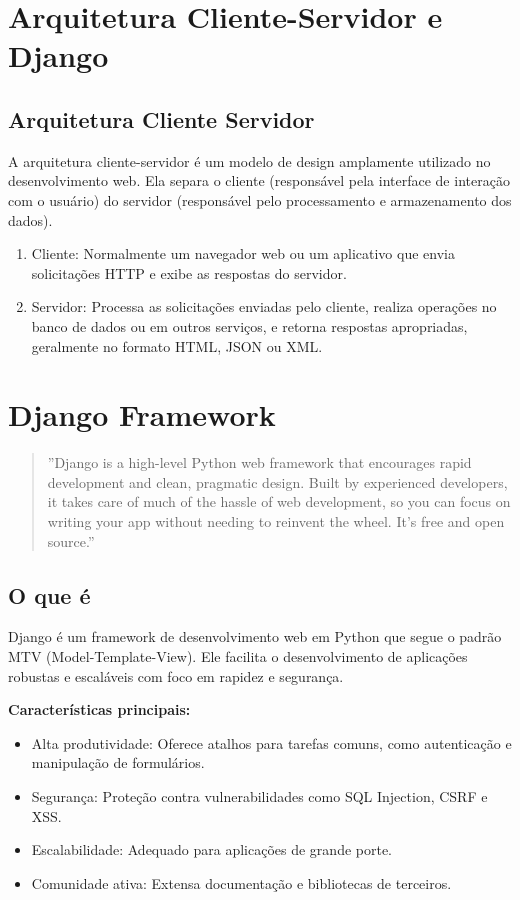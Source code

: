 \chapter{Arquitetura Cliente-Servidor e Django}

\section{Arquitetura Cliente Servidor}
A arquitetura cliente-servidor \'{e} um modelo de design amplamente utilizado no desenvolvimento web. Ela separa o cliente (respons\'avel pela interface de intera\c{c}\~ao com o usu\'ario) do servidor (respons\'avel pelo processamento e armazenamento dos dados).

\begin{enumerate}
    \item Cliente: Normalmente um navegador web ou um aplicativo que envia solicita\c{c}\~oes HTTP e exibe as respostas do servidor.
    \item Servidor: Processa as solicita\c{c}\~oes enviadas pelo cliente, realiza opera\c{c}\~oes no banco de dados ou em outros servi\c{c}os, e retorna respostas apropriadas, geralmente no formato HTML, JSON ou XML.
\end{enumerate}

\chapter{Django Framework}
\begin{quote}
''Django is a high-level Python web framework that encourages rapid development and clean, pragmatic design. Built by experienced developers, it takes care of much of the hassle of web development, so you can focus on writing your app without needing to reinvent the wheel. It’s free and open source.''
\end{quote}

\section{O que \'{e}}

Django \'{e} um framework de desenvolvimento web em Python que segue o padr\~ao MTV (Model-Template-View). Ele facilita o desenvolvimento de aplica\c{c}\~oes robustas e escal\'aveis com foco em rapidez e seguran\c{c}a.

\textbf{Caracter\'isticas principais:}
\begin{itemize}
    \item Alta produtividade: Oferece atalhos para tarefas comuns, como autentica\c{c}\~ao e manipula\c{c}\~ao de formul\'arios.
    \item Seguran\c{c}a: Prote\c{c}\~ao contra vulnerabilidades como SQL Injection, CSRF e XSS.
    \item Escalabilidade: Adequado para aplica\c{c}\~oes de grande porte.
    \item Comunidade ativa: Extensa documenta\c{c}\~ao e bibliotecas de terceiros.
\end{itemize}

